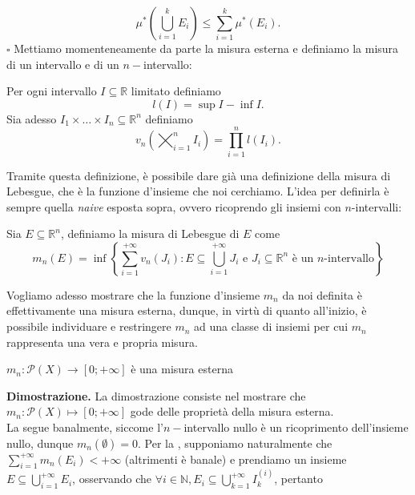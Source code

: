 	$$
	\mu^* \left( \bigcup_{i=1}^k E_i \right) \leq \sum_{i=1}^k \mu^*(E_i).
	$$
\hfill $\square$
%
Mettiamo momenteneamente da parte la misura esterna e definiamo la misura di un intervallo e di un $n-$intervallo:
%
\vspace{0.5cm}
\begin{definition}[\textcolor{blue}{misura di un intervallo e di un $n-$intervallo}]
	Per ogni intervallo $I \subseteq \mathbb{R}$ limitato definiamo
	$$
	\mathit{l}(I) = \sup{I} - \inf{I}.
	$$
	Sia adesso $I_1 \times \ldots \times I_n \subseteq \mathbb{R}^n$ definiamo
	$$
		v_n \left( \varprod_{i=1}^n I_i \right) = \prod_{i=1}^n \mathit{l}(I_i). 
	$$
\end{definition}
%
Tramite questa definizione, è possibile dare già una definizione della misura di Lebesgue, che è la funzione d'insieme che noi cerchiamo. L'idea per definirla è sempre quella \emph{naive} esposta sopra, ovvero ricoprendo gli insiemi con $n$-intervalli: 
%
\vspace{0.5cm}
\begin{definition}[\textcolor{blue}{misura di Lebesgue di un insieme $E$}]
	Sia $E \subseteq \mathbb{R}^n$, definiamo la misura di Lebesgue di $E$ come
	\begin{equation}
		m_n(E) = \inf \left\{ \sum_{i=1}^{+\infty} v_n(J_i) : E \subseteq \bigcup_{i=1}^{+\infty} J_i \text{ e } J_i \subseteq \mathbb{R}^n \text{ è un } n\text{-intervallo} \right\}
		\label{eq:def_lebesgue}
	\end{equation}
\end{definition}
%
Vogliamo adesso mostrare che la funzione d'insieme $m_n$ da noi definita è effettivamente una misura esterna, dunque, in virtù di quanto all'inizio, è possibile individuare e restringere $m_n$ ad una classe di insiemi per cui $m_n$ rappresenta una vera e propria misura.
%
\vspace{0.5cm}
\begin{prop}[\textcolor{blue}{misura di Lebesgue è una misura esterna}]
	$m_n: \mathcal{P}(X) \to [0; +\infty]$ è una misura esterna
	\label{prop:lebesgue_mis_esterna}
\end{prop}
%
\noindent \textbf{Dimostrazione. }
	La dimostrazione consiste nel mostrare che $m_n: \mathcal{P}(X) \mapsto [0; +\infty]$ gode delle proprietà della misura esterna. \\
	La  segue banalmente, siccome l'$n-$intervallo nullo è un ricoprimento dell'insieme nullo, dunque $m_n(\emptyset) = 0$.
	Per la , supponiamo naturalmente che $\sum\limits_{i=1}^{+\infty} m_n(E_i) < +\infty$ (altrimenti è banale) e prendiamo un insieme $E \subseteq \bigcup\limits_{i=1}^{+\infty} E_i$, osservando che $\forall i \in \mathbb{N}, E_i \subseteq \bigcup\limits_{k=1}^{+\infty} I_{k}^{(i)}$, pertanto
